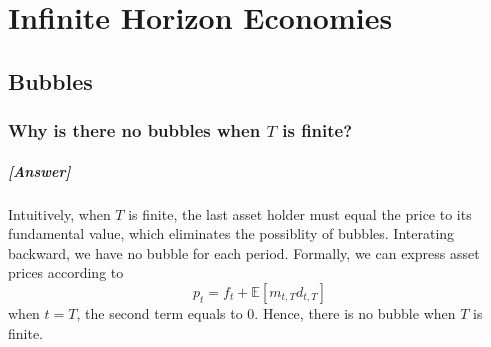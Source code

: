 \chapter{Infinite Horizon Economies}
\section{Bubbles}
\subsection{Why is there no bubbles when $T$ is finite?}
\paragraph{[Answer]}
Intuitively, when $T$ is finite, the last asset holder must equal the price to its fundamental value,
which eliminates the possiblity of bubbles.
Interating backward, we have no bubble for each period. 
Formally, we can express asset prices according to 
\[
p_t = f_t + \mathbb{E}[m_{t,T} d_{t,T}]
\]
when $t = T$, the second term equals to 0.
Hence, there is no bubble when $T$ is finite. 